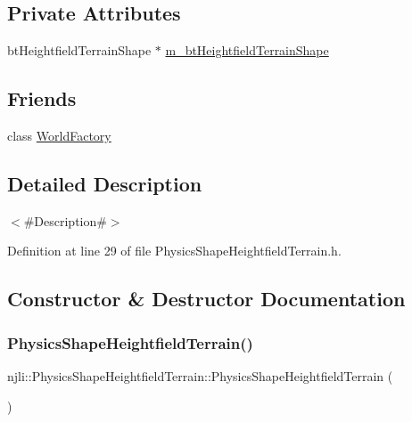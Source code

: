 \subsection*{Private Attributes}
\begin{DoxyCompactItemize}
\item 
bt\+Heightfield\+Terrain\+Shape $\ast$ \mbox{\hyperlink{classnjli_1_1_physics_shape_heightfield_terrain_aea1853b1ab3d6cfab816b4e8a70827d9}{m\+\_\+bt\+Heightfield\+Terrain\+Shape}}
\end{DoxyCompactItemize}
\subsection*{Friends}
\begin{DoxyCompactItemize}
\item 
class \mbox{\hyperlink{classnjli_1_1_physics_shape_heightfield_terrain_acb96ebb09abe8f2a37a915a842babfac}{World\+Factory}}
\end{DoxyCompactItemize}


\subsection{Detailed Description}
$<$\#\+Description\#$>$ 

Definition at line 29 of file Physics\+Shape\+Heightfield\+Terrain.\+h.



\subsection{Constructor \& Destructor Documentation}
\mbox{\label{classnjli_1_1_physics_shape_heightfield_terrain_a86dc8ee8ab41a62c6520cc7a33064fc1}} 
\subsubsection{\texorpdfstring{Physics\+Shape\+Heightfield\+Terrain()}{PhysicsShapeHeightfieldTerrain()}\hspace{0.1cm}{\footnotesize\ttfamily [1/3]}}
{\footnotesize\ttfamily njli\+::\+Physics\+Shape\+Heightfield\+Terrain\+::\+Physics\+Shape\+Heightfield\+Terrain (\begin{DoxyParamCaption}{ }\end{DoxyParamCaption})\hspace{0.3cm}{\ttfamily [protected]}}


